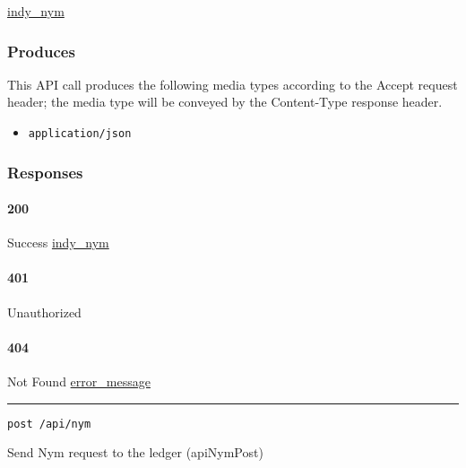 \protect\hyperlink{indy_nym}{indy\_nym}

\hypertarget{produces-141}{%
\subsubsection{Produces}\label{produces-141}}

This API call produces the following media types according to the
{Accept} request header; the media type will be conveyed by the
{Content-Type} response header.

\begin{itemize}
\tightlist
\item
  \texttt{application/json}
\end{itemize}

\hypertarget{responses-146}{%
\subsubsection{Responses}\label{responses-146}}

\hypertarget{section-468}{%
\paragraph{200}\label{section-468}}

Success \protect\hyperlink{indy_nym}{indy\_nym}

\hypertarget{section-469}{%
\paragraph{401}\label{section-469}}

Unauthorized \protect\hyperlink{}{}

\hypertarget{section-470}{%
\paragraph{404}\label{section-470}}

Not Found \protect\hyperlink{error_message}{error\_message}

\begin{center}\rule{0.5\linewidth}{\linethickness}\end{center}

\protect\hypertarget{apiNymPost}{}{}

\begin{verbatim}
post /api/nym
\end{verbatim}

Send Nym request to the ledger ({apiNymPost})

